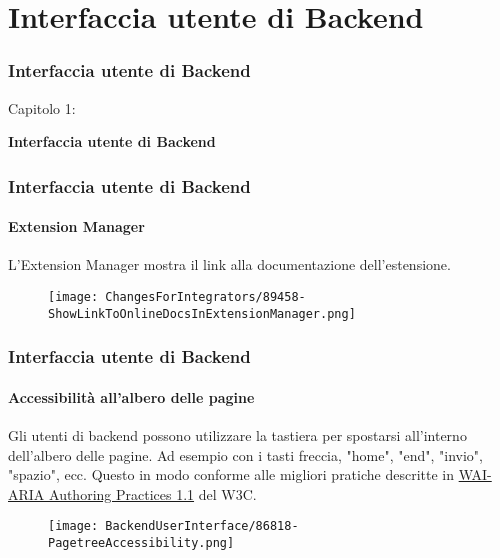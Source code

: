 %

\section{Interfaccia utente di Backend}
\begin{frame}[fragile]
	\frametitle{Interfaccia utente di Backend}

	\begin{center}\huge{Capitolo 1:}\end{center}
	\begin{center}\huge{\color{typo3darkgrey}\textbf{Interfaccia utente di Backend}}\end{center}

\end{frame}


\begin{frame}[fragile]
	\frametitle{Interfaccia utente di Backend}
	\framesubtitle{Extension Manager}

	L'Extension Manager mostra il link alla documentazione dell'estensione.

	\begin{figure}
		\texttt{[image: ChangesForIntegrators/89458-ShowLinkToOnlineDocsInExtensionManager.png]}
	\end{figure}

\end{frame}


\begin{frame}[fragile]
	\frametitle{Interfaccia utente di Backend}
	\framesubtitle{Accessibilità all'albero delle pagine}

	Gli utenti di backend possono utilizzare la tastiera per spostarsi all'interno dell'albero delle pagine.
	Ad esempio con i tasti freccia, "home", "end", "invio", "spazio", ecc.
	\newline
	Questo in modo conforme alle migliori pratiche descritte in
	\href{https://www.w3.org/TR/wai-aria-practices-1.1/#keyboard-interaction-22}{WAI-ARIA Authoring Practices 1.1}
	del W3C.

	\begin{figure}
		\texttt{[image: BackendUserInterface/86818-PagetreeAccessibility.png]}
	\end{figure}

\end{frame}

